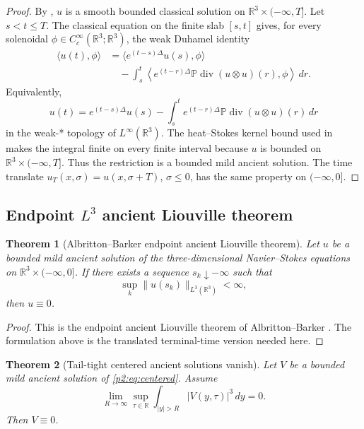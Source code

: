 \documentclass[11pt]{amsart}
\theoremstyle{plain}
\newtheorem{theorem}{Theorem}[section]
\theoremstyle{definition}
\theoremstyle{remark}
\numberwithin{equation}{section}
\newcommand{\R}{\mathbb R}
\newcommand{\divergence}{\operatorname{div}}
\begin{document}
\begin{proof}
By , \(u\) is a smooth bounded classical solution
on \(\R^3\times(-\infty,T]\).  Let \(s<t\le T\).  The classical equation on
the finite slab \([s,t]\) gives, for every solenoidal
\(\phi\in C_c^\infty(\R^3;\R^3)\), the weak Duhamel identity
\[
\begin{aligned}
   \langle u(t),\phi\rangle
   &=
   \langle e^{(t-s)\Delta}u(s),\phi\rangle \\
   &\quad
   -
   \int_s^t
   \left\langle
      e^{(t-r)\Delta}\mathbb P\divergence(u\otimes u)(r),
      \phi
   \right\rangle\,dr .
\end{aligned}
\]
Equivalently,
\[
   u(t)
   =
   e^{(t-s)\Delta}u(s)
   -
   \int_s^t
   e^{(t-r)\Delta}\mathbb P\divergence(u\otimes u)(r)\,dr
\]
in the weak-* topology of \(L^\infty(\R^3)\).  The heat--Stokes kernel bound
used in  makes the integral finite on every
finite interval because \(u\) is bounded on
\(\R^3\times(-\infty,T]\).  Thus the restriction is a bounded mild ancient
solution.  The time translate \(u_T(x,\sigma)=u(x,\sigma+T)\),
\(\sigma\le0\), has the same property on \((-\infty,0]\).
\end{proof}

\subsection{\texorpdfstring{Endpoint \(L^3\) ancient Liouville theorem}{Endpoint L3 ancient Liouville theorem}}

\begin{theorem}[Albritton--Barker endpoint ancient Liouville theorem]
\label{p2:thm:AB-endpoint}
Let \(u\) be a bounded mild ancient solution of the three-dimensional
Navier--Stokes equations on \(\R^3\times(-\infty,0]\).  If there exists a
sequence \(s_k\downarrow-\infty\) such that
\[
   \sup_k\|u(s_k)\|_{L^3(\R^3)}<\infty,
\]
then \(u\equiv0\).
\end{theorem}

\begin{proof}
This is the endpoint ancient Liouville theorem of Albritton--Barker
\cite{AlbrittonBarker2019}.  The formulation above is the translated
terminal-time version needed here.
\end{proof}

\begin{theorem}[Tail-tight centered ancient solutions vanish]
\label{p2:thm:tight-liouville}
Let \(V\) be a bounded mild ancient solution of \eqref{p2:eq:centered}.  Assume
\[
   \lim_{R\to\infty}
   \sup_{\tau\in\R}\int_{|y|>R}|V(y,\tau)|^3\,dy=0 .
\]
Then \(V\equiv0\).
\end{theorem}
\end{document}
